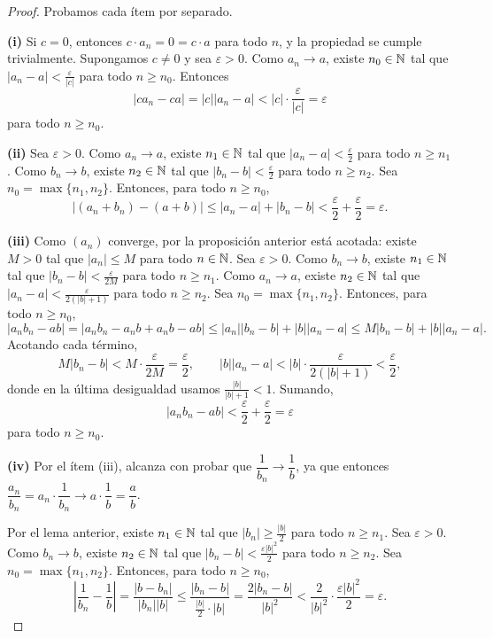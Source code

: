 \begin{proof}
Probamos cada ítem por separado.

\medskip
\noindent\textbf{(i)} Si $c = 0$, entonces $c \cdot a_n = 0 = c \cdot a$ para todo
$n$, y la propiedad se cumple trivialmente. Supongamos $c \neq 0$ y sea
$\varepsilon > 0$. Como $a_n \to a$, existe $n_0 \in \mathbb{N}$ tal que
$|a_n - a| < \tfrac{\varepsilon}{|c|}$ para todo $n \ge n_0$. Entonces
\[
|c a_n - c a| = |c||a_n - a| < |c| \cdot \frac{\varepsilon}{|c|} = \varepsilon
\]
para todo $n \ge n_0$.

\medskip
\noindent\textbf{(ii)} Sea $\varepsilon > 0$. Como $a_n \to a$, existe $n_1 \in \mathbb{N}$
tal que $|a_n - a| < \tfrac{\varepsilon}{2}$ para todo $n \ge n_1$. Como
$b_n \to b$, existe $n_2 \in \mathbb{N}$ tal que $|b_n - b| < \tfrac{\varepsilon}{2}$ para
todo $n \ge n_2$. Sea $n_0 = \max\{n_1, n_2\}$. Entonces, para todo $n \ge n_0$,
\[
|(a_n + b_n) - (a+b)| \le |a_n - a| + |b_n - b| < \frac{\varepsilon}{2} +
\frac{\varepsilon}{2} = \varepsilon.
\]

\medskip
\noindent\textbf{(iii)} Como $(a_n)$ converge, por la proposición anterior está
acotada: existe $M > 0$ tal que $|a_n| \le M$ para todo $n \in \mathbb{N}$. Sea
$\varepsilon > 0$. Como $b_n \to b$, existe $n_1 \in \mathbb{N}$ tal que
$|b_n - b| < \tfrac{\varepsilon}{2M}$ para todo $n \ge n_1$. Como $a_n \to a$,
existe $n_2 \in \mathbb{N}$ tal que $|a_n - a| < \tfrac{\varepsilon}{2(|b|+1)}$ para todo
$n \ge n_2$. Sea $n_0 = \max\{n_1, n_2\}$. Entonces, para todo $n \ge n_0$,
\[
|a_n b_n - ab| = |a_n b_n - a_n b + a_n b - ab|
\le |a_n||b_n - b| + |b||a_n - a|
\le M|b_n - b| + |b||a_n - a|.
\]
Acotando cada término,
\[
M|b_n - b| < M \cdot \frac{\varepsilon}{2M} = \frac{\varepsilon}{2},
\qquad
|b||a_n - a| < |b| \cdot \frac{\varepsilon}{2(|b|+1)} < \frac{\varepsilon}{2},
\]
donde en la última desigualdad usamos $\frac{|b|}{|b|+1} < 1$. Sumando,
\[
|a_n b_n - ab| < \frac{\varepsilon}{2} + \frac{\varepsilon}{2} = \varepsilon
\]
para todo $n \ge n_0$.

\medskip
\noindent\textbf{(iv)} Por el ítem (iii), alcanza con probar que
$\dfrac{1}{b_n} \to \dfrac{1}{b}$, ya que entonces
$\dfrac{a_n}{b_n} = a_n \cdot \dfrac{1}{b_n} \to a \cdot \dfrac{1}{b} = \dfrac{a}{b}$.

Por el lema anterior, existe $n_1 \in \mathbb{N}$ tal que $|b_n| \ge \tfrac{|b|}{2}$ para
todo $n \ge n_1$. Sea $\varepsilon > 0$. Como $b_n \to b$, existe $n_2 \in \mathbb{N}$ tal
que $|b_n - b| < \tfrac{\varepsilon |b|^2}{2}$ para todo $n \ge n_2$. Sea
$n_0 = \max\{n_1, n_2\}$. Entonces, para todo $n \ge n_0$,
\[
\left| \frac{1}{b_n} - \frac{1}{b} \right|
= \frac{|b - b_n|}{|b_n||b|}
\le \frac{|b_n - b|}{\tfrac{|b|}{2} \cdot |b|}
= \frac{2|b_n - b|}{|b|^2}
< \frac{2}{|b|^2} \cdot \frac{\varepsilon |b|^2}{2}
= \varepsilon.
\]


\end{proof}
